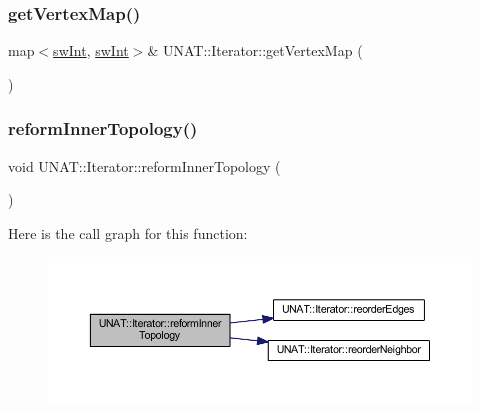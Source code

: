 \mbox{\label{classUNAT_1_1Iterator_ac05240478478b3d1aba6af28e364cf50}} 
\subsubsection{\texorpdfstring{getVertexMap()}{getVertexMap()}\hspace{0.1cm}{\footnotesize\ttfamily [2/2]}}
{\footnotesize\ttfamily map$<$\mbox{\hyperlink{include_2swMacro_8h_a113cf5f6b5377cdf3fac6aa4e443e9aa}{sw\+Int}}, \mbox{\hyperlink{include_2swMacro_8h_a113cf5f6b5377cdf3fac6aa4e443e9aa}{sw\+Int}}$>$\& U\+N\+A\+T\+::\+Iterator\+::get\+Vertex\+Map (\begin{DoxyParamCaption}{ }\end{DoxyParamCaption})\hspace{0.3cm}{\ttfamily [inline]}}

\mbox{\label{classUNAT_1_1Iterator_ad25934bd952c01d0a82d3db33e46604a}} 
\subsubsection{\texorpdfstring{reformInnerTopology()}{reformInnerTopology()}\hspace{0.1cm}{\footnotesize\ttfamily [1/2]}}
{\footnotesize\ttfamily void U\+N\+A\+T\+::\+Iterator\+::reform\+Inner\+Topology (\begin{DoxyParamCaption}{ }\end{DoxyParamCaption})\hspace{0.3cm}{\ttfamily [inline]}}

Here is the call graph for this function\+:
\nopagebreak
\begin{figure}[H]
\begin{center}
\leavevmode
\includegraphics[width=350pt]{classUNAT_1_1Iterator_ad25934bd952c01d0a82d3db33e46604a_cgraph}
\end{center}
\end{figure}
\mbox{\label{classUNAT_1_1Iterator_ad25934bd952c01d0a82d3db33e46604a}} 
